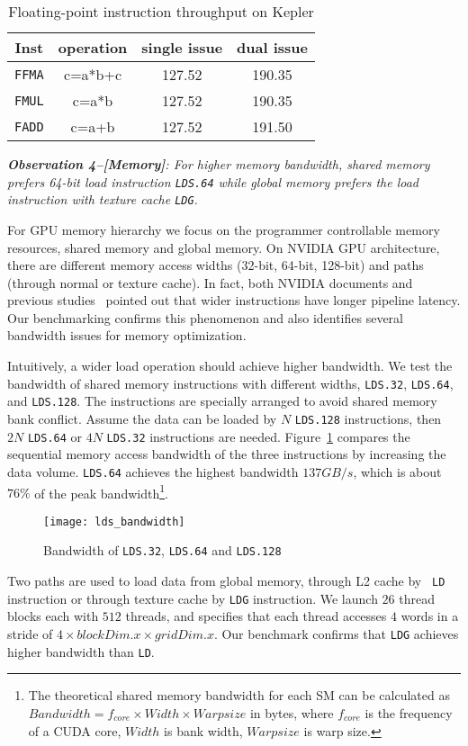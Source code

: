 \begin{table}[htbp]
\caption{Floating-point instruction throughput on Kepler}
\centering
\scalebox{1.} {
\begin{tabular}{|c||c|c|c|}
\hline
Inst &operation&single issue&dual issue\\
\hline
{\tt FFMA} &c=a*b+c&127.52&190.35 \\
\hline
{\tt FMUL} &c=a*b&127.52&190.35 \\
\hline
{\tt FADD} &c=a+b&127.52&191.50\\
\hline
\end{tabular}
}
\label{tab:ffma}
\end{table}


{\em {\bf Observation 4--[Memory]}: For higher memory bandwidth, shared memory prefers 64-bit load
instruction {\tt LDS.64} while global memory prefers the load instruction with texture cache {\tt LDG}.}

For GPU memory hierarchy we focus on the programmer controllable memory resources, shared memory and global memory.
On NVIDIA GPU architecture, there are different memory access widths (32-bit, 64-bit, 128-bit) and paths (through normal or texture cache).
In fact, both NVIDIA documents and previous studies~\cite{tan} pointed out that wider
instructions have longer pipeline latency.
Our benchmarking confirms this phenomenon and also identifies several bandwidth issues for memory optimization.


Intuitively, a wider load operation should achieve higher bandwidth.
We test the bandwidth of shared memory instructions with different widths, {\tt LDS.32}, {\tt LDS.64},
and {\tt LDS.128}.
The instructions are specially arranged to avoid shared memory bank conflict.
Assume the data can be loaded by $N$ {\tt LDS.128} instructions,
then $2N$ {\tt LDS.64} or $4N$ {\tt LDS.32} instructions are needed.
Figure~\ref{fig:lds_bw} compares the sequential memory access bandwidth of the three instructions by increasing the data volume.
{\tt LDS.64} achieves the highest bandwidth $137GB/s$, which is about $76\%$ of the peak bandwidth\footnote{The
theoretical shared memory bandwidth for each SM can be calculated as $Bandwidth = f_{core} \times Width \times Warpsize$ in
bytes, where $f_{core}$ is the frequency of a CUDA core, $Width$ is bank width, $Warpsize$ is warp size.}.

\begin{figure}[htbp]
\begin{center}
\texttt{[image: lds\_bandwidth]}
    \caption{ Bandwidth of {\tt LDS.32}, {\tt LDS.64} and {\tt LDS.128}}
\label{fig:lds_bw}
\end{center}
\end{figure}

Two paths are used to load data from global memory, through L2 cache by {\tt
LD} instruction or through texture cache by {\tt LDG} instruction.
We launch $26$ thread blocks each with $512$ threads, and specifies that each thread accesses $4$ words in a stride of $4 \times blockDim.x \times gridDim.x$.
Our benchmark confirms that {\tt LDG} achieves higher bandwidth than {\tt LD}.
